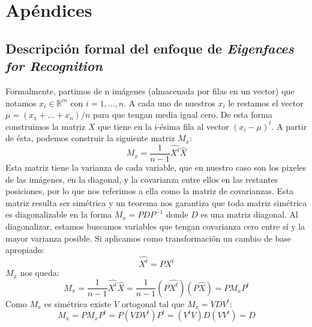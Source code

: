 \section{Apéndices}

\subsection{Descripción formal del enfoque de \textit{Eigenfaces for Recognition}}
\label{demo-formal-intro}
Formalmente, partimos de n imágenes (almacenada por filas en un vector) que notamos $x_i\in\mathbb{R}^m$ con $i = 1,...,n$. A cada uno de nuestros $x_i$ le restamos el vector $\mu = (x_1+...+x_n)/n$ para que tengan media igual cero. De esta forma construimos la matriz $X$ que
tiene en la i-ésima fila al vector $(x_i-\mu)^t$.  A partir de ésta, podemos construir la siguiente matriz $M_x$:
\begin{displaymath}
 M_x = \frac{1}{n-1}\hat{X^t}\hat{X}
\end{displaymath}
Esta matriz tiene la varianza de cada variable, que en nuestro caso son los pixeles de las imágenes, en la diagonal, y la covarianza entre ellos en las restantes posiciones, por lo que nos referimos a ella como la matriz de covarianzas. Esta matriz resulta ser simétrica y un teorema nos garantiza que toda matriz simétrica es diagonalizable en la forma $M_x = PDP^{-1}$ donde $D$ es una matriz diagonal.
Al diagonalizar, estamos buscamos variables que tengan covarianza cero entre sí y la 
mayor varianza posible. Si aplicamos como transformación un cambio de base apropiado:
\begin{displaymath}
 \hat{X^t} = PX^t
\end{displaymath}
$M_x$ nos queda:
\begin{displaymath}
 M_x = \frac{1}{n-1}\hat{X^t}\hat{X} = \frac{1}{n-1}(P\hat{X^t})(P\hat{X}) = PM_xP^t
\end{displaymath}
Como $M_x$ es simétrica existe $V$ ortogonal tal que $M_x = VD{V^t}$:
\begin{displaymath}
 M_x = PM_xP^t = P(VD{V^t})P^t = ({V^t}V)D(V{V^t}) = D
\end{displaymath}
